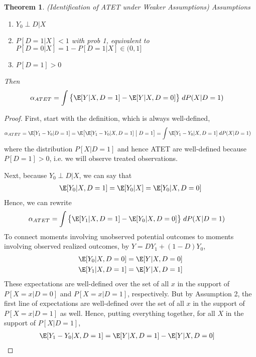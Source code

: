\documentclass[12pt]{article}
\theoremstyle{plain}
\newtheorem{thm}{Theorem}[section]
\theoremstyle{definition}
\theoremstyle{remark}
\begin{document}
\begin{thm}
\emph{(Identification of ATET under Weaker Assumptions)}
Assumptions
\begin{enumerate}
  \item $Y_0\perp D|X$
  \item $P[D=1|X]< 1$ with prob 1,
    equivalent to $P[D=0|X]=1-P[D=1|X]\in (0,1]$
  \item $P[D=1]>0$
\end{enumerate}
Then
\begin{align*}
  \alpha_{ATET}
  &=
  \int
  \big\{
  \E[Y|X,D=1]
  -
  \E[Y|X,D=0]
  \big\}
  \;dP(X|D=1)
\end{align*}
\end{thm}
\begin{proof}
First, start with the definition, which is always well-defined,
\begin{align*}
  \alpha_{ATET}
  &=
  \E[Y_1-Y_0|D=1]
  =
  \E\big[
  \E[Y_1-Y_0|X,D=1]
  \;\big|\;D=1
  \big]
  =
  \int
  \E[Y_1-Y_0|X,D=1]
  \;dP(X|D=1)
\end{align*}
where the distribution $P[X|D=1]$ and hence ATET are well-defined
because $P[D=1]>0$, i.e. we will observe treated observations.

Next, because $Y_0\perp D|X$, we can say that
\begin{align*}
  \E[Y_0|X,D=1]
  =
  \E[Y_0|X]
  =
  \E[Y_0|X,D=0]
\end{align*}
Hence, we can rewrite
\begin{align*}
  \alpha_{ATET}
  &=
  \int
  \big\{
  \E[Y_1|X,D=1]
  -
  \E[Y_0|X,D=0]
  \big\}
  \;dP(X|D=1)
\end{align*}
To connect moments involving unobserved potential outcomes to moments
involving observed realized outcomes, by $Y=DY_1 + (1-D)Y_0$,
\begin{align*}
  \E[Y_0|X,D=0]
  &=
  \E[Y|X,D=0]
  \\
  \E[Y_1|X,D=1]
  &=
  \E[Y|X,D=1]
\end{align*}
These expectations are well-defined over the set of all $x$ in the
support of $P[X=x|D=0]$ and $P[X=x|D=1]$, respectively.
But by Assumption 2, the first line of expectations are well-defined
over the set of all $x$ in the support of $P[X=x|D=1]$ as well.
Hence, putting everything together,
for all $X$ in the support of $P[X|D=1]$,
\begin{align*}
  \E[Y_1-Y_0|X,D=1]
  &=
  \E[Y|X,D=1]
  -
  \E[Y|X,D=0]
\end{align*}
\end{proof}
\end{document}

